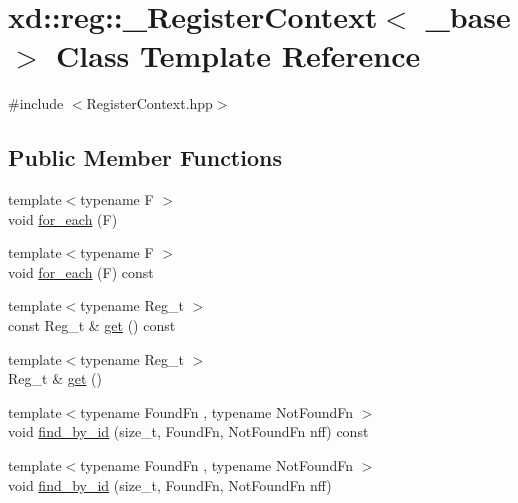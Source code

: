 \hypertarget{classxd_1_1reg_1_1___register_context_3_01__base_01_4}{}\section{xd\+:\+:reg\+:\+:\+\_\+\+Register\+Context$<$ \+\_\+base $>$ Class Template Reference}
\label{classxd_1_1reg_1_1___register_context_3_01__base_01_4}


{\ttfamily \#include $<$Register\+Context.\+hpp$>$}

\subsection*{Public Member Functions}
\begin{DoxyCompactItemize}
\item 
{\footnotesize template$<$typename F $>$ }\\void \mbox{\hyperlink{classxd_1_1reg_1_1___register_context_3_01__base_01_4_a5a9557096a73615873ad18f5c8d33c03}{for\+\_\+each}} (F)
\item 
{\footnotesize template$<$typename F $>$ }\\void \mbox{\hyperlink{classxd_1_1reg_1_1___register_context_3_01__base_01_4_a303740bb479f0d6c4317456707ebf7d4}{for\+\_\+each}} (F) const
\item 
{\footnotesize template$<$typename Reg\+\_\+t $>$ }\\const Reg\+\_\+t \& \mbox{\hyperlink{classxd_1_1reg_1_1___register_context_3_01__base_01_4_a804929498906548694e856a70efc596c}{get}} () const
\item 
{\footnotesize template$<$typename Reg\+\_\+t $>$ }\\Reg\+\_\+t \& \mbox{\hyperlink{classxd_1_1reg_1_1___register_context_3_01__base_01_4_a58d14ac7870567d48fea635c157ee593}{get}} ()
\item 
{\footnotesize template$<$typename Found\+Fn , typename Not\+Found\+Fn $>$ }\\void \mbox{\hyperlink{classxd_1_1reg_1_1___register_context_3_01__base_01_4_a4d4a23d689a4b6521af56e38f0b93966}{find\+\_\+by\+\_\+id}} (size\+\_\+t, Found\+Fn, Not\+Found\+Fn nff) const
\item 
{\footnotesize template$<$typename Found\+Fn , typename Not\+Found\+Fn $>$ }\\void \mbox{\hyperlink{classxd_1_1reg_1_1___register_context_3_01__base_01_4_a6b14a0314f94d992c474afd8083c65ff}{find\+\_\+by\+\_\+id}} (size\+\_\+t, Found\+Fn, Not\+Found\+Fn nff)
\end{DoxyCompactItemize}

